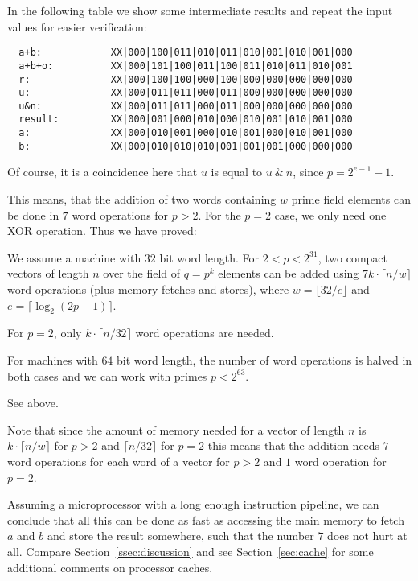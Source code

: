 In the following table we show some intermediate results and repeat
the input values for easier verification:

\begin{verbatim}
  a+b:            XX|000|100|011|010|011|010|001|010|001|000
  a+b+o:          XX|000|101|100|011|100|011|010|011|010|001
  r:              XX|000|100|100|000|100|000|000|000|000|000
  u:              XX|000|011|011|000|011|000|000|000|000|000
  u&n:            XX|000|011|011|000|011|000|000|000|000|000
  result:         XX|000|001|000|010|000|010|001|010|001|000
  a:              XX|000|010|001|000|010|001|000|010|001|000
  b:              XX|000|010|010|010|001|001|001|000|000|000
\end{verbatim}

Of course, it is a coincidence here that $u$ is equal to 
$u \ \&\ n$, since $p = 2^{e-1}-1$.

This means, that the addition of two words containing $w$ prime field
elements can be done in $7$ word operations for $p > 2$. For the
$p=2$ case, we only need one XOR operation. Thus we have proved:

\begin{Prop}
\label{addvec}
We assume a machine with $32$ bit word length. For $2 < p < 2^{31}$,
two compact vectors of length $n$ over the field of $q=p^k$
elements can be added using $7k\cdot \lceil n/w \rceil$ word operations
(plus memory fetches and stores), where $w = \lfloor 32/e \rfloor$
and $e = \lceil \log_2(2p-1) \rceil$. 

For $p=2$, only $k \cdot \lceil n/32 \rceil$ word operations are needed.

For machines with $64$ bit word length, the number of word operations
is halved in both cases and we can work with primes $p < 2^{63}$.
\end{Prop}
\Proof See above. \ProofEnd

\begin{Rem}
Note that since the amount of memory needed for a vector of length $n$
is $k \cdot \lceil n/w \rceil$ for $p > 2$ and $\lceil n/32 \rceil$ for
$p=2$ this means that the addition needs $7$ word operations for each
word of a vector for $p>2$ and $1$ word operation for $p=2$.

Assuming a microprocessor
with a long enough instruction pipeline, we can conclude that all this
can be done as fast as accessing the main memory to fetch $a$ and $b$ and
store the result somewhere, such that the number $7$ does not hurt at all. 
Compare Section~\ref{ssec:discussion} and see Section~\ref{sec:cache}
for some additional comments on processor caches.
\end{Rem}

